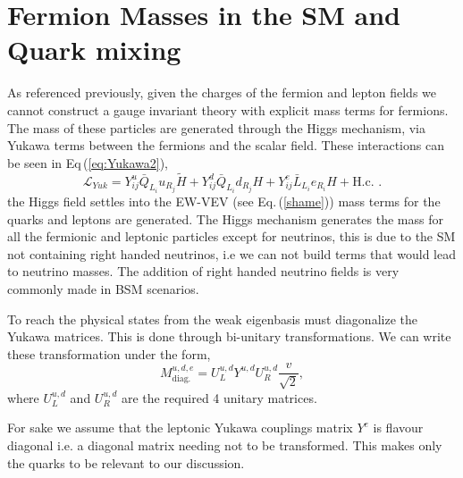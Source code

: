 \renewcommand{\cleardoublepage}{}
\renewcommand{\clearpage}{}

\section{Fermion Masses in the SM and Quark mixing}
\label{Chap_1_Sec_3}

As referenced previously, given the charges of the fermion and lepton fields we cannot construct a gauge invariant theory with explicit mass terms for fermions. 
%
The mass of these particles are generated through the Higgs mechanism, via Yukawa terms between the fermions and the scalar field. 
%
These interactions can be seen in Eq\,(\ref{eq:Yukawa2}), 
%
\begin{equation} 
\label{eq:Yukawa2}
\mathcal{L}_{Yuk} = Y^u_{ij} \bar{Q}_{L_i} u_{R_j}  \tilde{H} + Y^d_{ij} \bar{Q}_{L_i}  d_{R_j} H  + Y^e_{ij} \bar{L}_{L_i}  e_{R_i} H + \text{H.c. .} 
\end{equation} 
%
 the Higgs field settles into the EW-VEV (see Eq.\,(\ref{shame}))\Joaoadd{,} mass terms for the quarks and leptons are generated. 
%
The Higgs mechanism generates the mass for all the fermionic and leptonic particles except for neutrinos, this is due to the SM not containing right handed neutrinos, i.e we can not build terms that would lead to neutrino masses.
% 
The addition of right handed neutrino fields is very commonly made in BSM scenarios. 

To reach the physical states from the weak eigenbasis  must diagonalize the Yukawa matrices. This is done through bi-unitary transformations. 
% 
We can write these transformation under the form,
%
\begin{equation}
\label{YukawaMasses} 
M^{u,d,e}_{\text{diag.}}= U^{u,d}_L Y^{u,d} U^{u,d}_R \frac{v}{\sqrt{2}} , 
\end{equation} 
%
where $U^{u,d}_L$ and $U^{u,d}_R$ are the required 4 unitary matrices. 

%
%
For  sake we assume that the leptonic Yukawa couplings matrix $Y^{e}$ is flavour diagonal i.e. a diagonal matrix needing not to be transformed. This makes only the quarks to be relevant to our discussion.  

